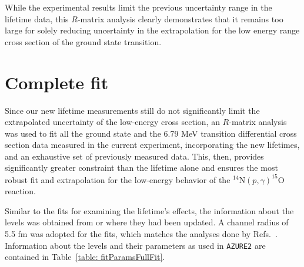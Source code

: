 While the experimental results limit the previous uncertainty range in the lifetime data, this $R$-matrix analysis clearly demonstrates that it remains too large for solely reducing uncertainty in the extrapolation for the low energy range cross section of the ground state transition.

\section{Complete fit}
\label{sec: complete fit}


Since our new lifetime measurements still do not significantly limit the extrapolated uncertainty of the low-energy cross section, an $R$-matrix analysis was used to fit all the ground state and the 6.79 MeV transition differential cross section data measured in the current experiment, incorporating the new lifetimes, and an exhaustive set of previously measured data. This, then, provides significantly greater constraint than the lifetime alone and ensures the most robust fit and extrapolation for the low-energy behavior of the $^{14}$N$(p,\gamma)^{15}$O reaction.

Similar to the fits for examining the lifetime's effects, the information about the levels was obtained from  \citet{Ajzenberg-Selove1991} or \citet{Daigle2016} where they had been updated. A channel radius of 5.5 fm was adopted for the fits, which matches the analyses done by Refs.~\cite{Adelberger2011, Li2016, Wagner2018}. Information about the levels and their parameters as used in \texttt{AZURE2} are contained in Table~\ref{table: fitParamsFullFit}. 


